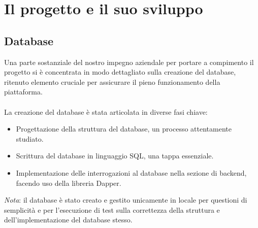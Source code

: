 \chapter{Il progetto e il suo sviluppo}\label{chapter:formattazione}
%
\section{Database}\label{sec:cap_sec_subsec}
Una parte sostanziale del nostro impegno aziendale per portare a compimento il
progetto si è concentrata in modo dettagliato sulla creazione del database,
ritenuto elemento cruciale per assicurare il pieno funzionamento della
piattaforma. \\ \\ La creazione del database è stata articolata in diverse fasi
chiave:
\begin{itemize}
	\item Progettazione della struttura del database, un processo attentamente studiato.
	\item Scrittura del database in linguaggio SQL, una tappa essenziale.
	\item Implementazione delle interrogazioni al database nella sezione di backend,
	      facendo uso della libreria Dapper.
\end{itemize}
\textit{Nota}: il database è stato creato e gestito unicamente in locale per questioni di semplicità e per
l'esecuzione di test sulla correttezza della struttura e dell'implementazione del database stesso.
%
%

